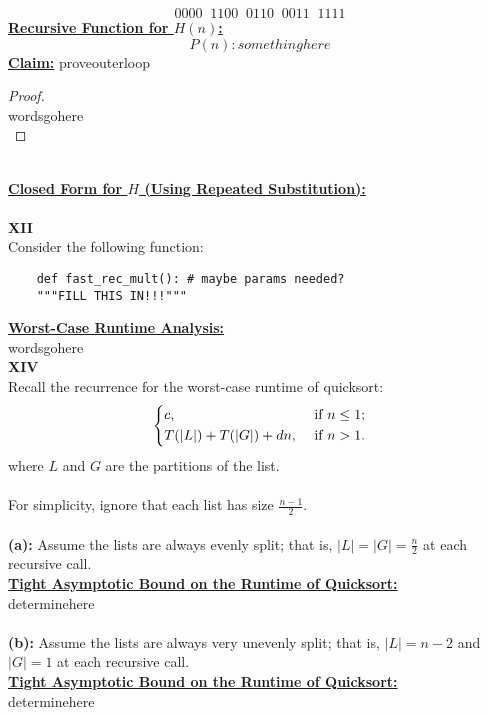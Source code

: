 \documentclass[12pt]{article}
\begin{document}
\[
0000 \;\; 1100 \;\; 0110 \;\; 0011 \;\; 1111
\]
\textbf{\underline{Recursive Function for $H(n)$:}} \\
\[P(n): somethinghere\]
\textbf{\underline{Claim:}} proveouterloop
\begin{proof}
\leavevmode\\
    wordsgohere \\
\end{proof}
\leavevmode\\
\textbf{\underline{Closed Form for $H$ (Using Repeated Substitution):}} \\
\\
\textbf{XII} \\
Consider the following function:
\begin{lstlisting}
    def fast_rec_mult(): # maybe params needed?
    """FILL THIS IN!!!"""
\end{lstlisting}
\textbf{\underline{Worst-Case Runtime Analysis:}} \\
wordsgohere
\\
\textbf{XIV} \\
Recall the recurrence for the worst-case runtime of quicksort:
\[ \begin{dcases}
    c, &\text{ if } n \leq 1; \\
    T(|L|) + T(|G|) + dn, &\text{ if } n > 1.
\end{dcases}
\] where $L$ and $G$ are the partitions of the list. \\
\\
For simplicity, ignore that each list has size \(\frac{n-1}{2}\). \\
\\
\textbf{(a):} Assume the lists are always evenly split; that is, \(|L| = |G| = \frac{n}{2}\) at each recursive call. \\
\textbf{\underline{Tight Asymptotic Bound on the Runtime of Quicksort:}} \\
determinehere \\
\\
\textbf{(b):} Assume the lists are always very unevenly split; that is, \(|L| = n - 2\) and \(|G| = 1\) at each recursive call. \\
\textbf{\underline{Tight Asymptotic Bound on the Runtime of Quicksort:}} \\
determinehere \\
\\
\end{document}
